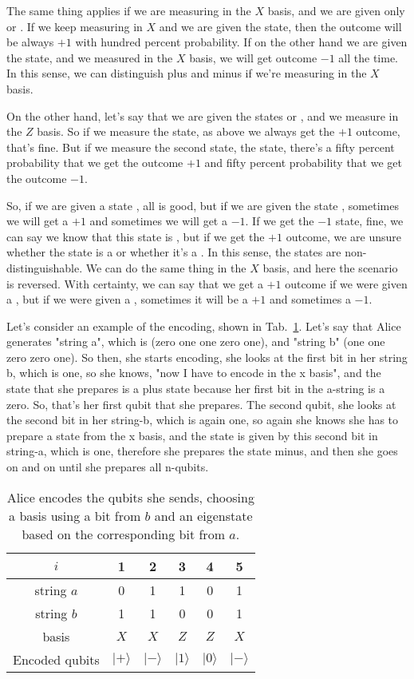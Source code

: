 The same thing applies if we are measuring in the $X$ basis, and we are given only \ket{+} or \ket{-}. If we keep measuring in $X$ and we are given the \ket{+} state, then the outcome will be always $+1$ with hundred percent probability. If on the other hand we are given the \ket{-} state, and we measured in the $X$ basis, we will get outcome $-1$ all the time. In this sense, we can distinguish plus and minus if we're measuring in the $X$ basis.

On the other hand, let's say that we are given the states  or \ket{+}, and we measure in the $Z$ basis. So if we measure the  state, as above we always get the $+1$ outcome, that's fine. But if we measure the second state, the \ket{+} state, there's a fifty percent probability that we get the outcome $+1$ and fifty percent probability that we get the outcome $-1$.

So, if we are given a state , all is good, but if we are given the state \ket{+}, sometimes we will get a $+1$ and sometimes we will get a $-1$. If we get the $-1$ state, fine, we can say we know that this state is \ket{+}, but if we get the $+1$ outcome, we are unsure whether the state is a \ket{+} or whether it's a . In this sense, the states are non-distinguishable. We can do the same thing in the $X$ basis, and here the scenario is reversed. With certainty, we can say that we get a $+1$ outcome if we were given a \ket{+}, but if we were given a , sometimes it will be a $+1$ and sometimes a $-1$.

Let's consider an example of the encoding, shown in Tab.~\ref{tab:bb84-example}. Let's say that Alice generates "string a", which is (zero one one zero one), and "string b" (one one zero zero one). So then, she starts encoding, she looks at the first bit in her string b, which is one, so she knows, "now I have to encode in the x basis", and the state that she prepares is a plus state because her first bit in the a-string is a zero. So, that's her first qubit that she prepares. The second qubit, she looks at the second bit in her string-b, which is again one, so again she knows she has to prepare a state from the x basis, and the state is given by this second bit in string-a, which is one, therefore she prepares the state minus, and then she goes on and on until she prepares all n-qubits.

\begin{table}
\begin{tabular}{|c||c|c|c|c|c|}
\hline $i$ & 1 & 2 & 3 & 4 & 5 \\
\hline string $a$ & 0 & 1 & 1 & 0 & 1 \\
string $b$ & 1 & 1 & 0 & 0 & 1 \\
basis & $X$ & $X$ & $Z$ & $Z$ & $X$ \\
Encoded qubits & $|+\rangle$ & $|-\rangle$ & $|1\rangle$ & $|0\rangle$ & $|-\rangle$ \\
\hline
\end{tabular}
\caption[BB84 encoding example]{Alice encodes the qubits she sends, choosing a basis using a bit from $b$ and an eigenstate based on the corresponding bit from $a$.}
\label{tab:bb84-example}
\end{table}

